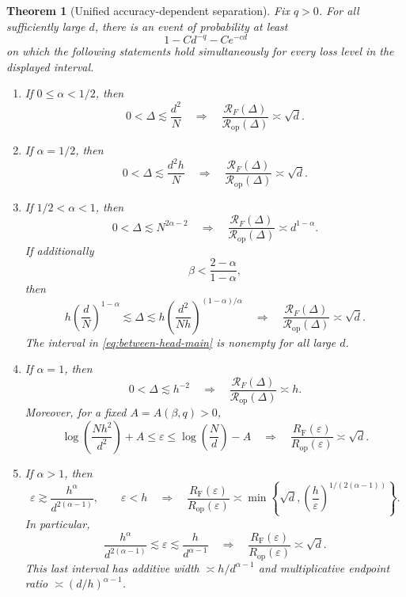 \documentclass[11pt]{article}
\newtheorem{theorem}{Theorem}[section]
\theoremstyle{definition}
\newcommand{\RF}{R_{\mathrm F}}
\newcommand{\Rop}{R_{\mathrm{op}}}
\newcommand{\eps}{\varepsilon}
\begin{document}
\begin{theorem}[Unified accuracy-dependent separation]
\label{thm:main}
Fix $q>0$.  For all sufficiently large $d$, there is an event of
probability at least
\begin{equation}
 1-Cd^{-q}-Ce^{-cd}
 \label{eq:main-prob}
\end{equation}
on which the following statements hold simultaneously for every loss
level in the displayed interval.
\begin{enumerate}[label=\textup{(\roman*)}]
\item If $0\leq\alpha<1/2$, then
\[
 0<\Delta\lesssim \frac{d^2}{N}
 \quad\Longrightarrow\quad
 \frac{\mathcal R_F(\Delta)}{\mathcal R_{\mathrm{op}}(\Delta)}
 \asymp\sqrt d.
\]
\item If $\alpha=1/2$, then
\[
 0<\Delta\lesssim \frac{d^2h}{N}
 \quad\Longrightarrow\quad
 \frac{\mathcal R_F(\Delta)}{\mathcal R_{\mathrm{op}}(\Delta)}
 \asymp\sqrt d.
\]
\item If $1/2<\alpha<1$, then
\[
 0<\Delta\lesssim N^{2\alpha-2}
 \quad\Longrightarrow\quad
 \frac{\mathcal R_F(\Delta)}{\mathcal R_{\mathrm{op}}(\Delta)}
 \asymp d^{1-\alpha}.
\]
If additionally
\begin{equation}
 \beta<\frac{2-\alpha}{1-\alpha},
 \label{eq:between-condition}
\end{equation}
then
\begin{equation}
 h\left(\frac dN\right)^{1-\alpha}
 \lesssim\Delta\lesssim
 h\left(\frac{d^2}{Nh}\right)^{(1-\alpha)/\alpha}
 \quad\Longrightarrow\quad
 \frac{\mathcal R_F(\Delta)}{\mathcal R_{\mathrm{op}}(\Delta)}
 \asymp\sqrt d.
 \label{eq:between-head-main}
\end{equation}
The interval in \eqref{eq:between-head-main} is nonempty for all large
$d$.
\item If $\alpha=1$, then
\[
 0<\Delta\lesssim h^{-2}
 \quad\Longrightarrow\quad
 \frac{\mathcal R_F(\Delta)}{\mathcal R_{\mathrm{op}}(\Delta)}
 \asymp h.
\]
Moreover, for a fixed $A=A(\beta,q)>0$,
\begin{equation}
 \log\!\left(\frac{Nh^2}{d^2}\right)+A
 \leq\eps\leq
 \log\!\left(\frac Nd\right)-A
 \quad\Longrightarrow\quad
 \frac{\RF(\eps)}{\Rop(\eps)}\asymp\sqrt d.
 \label{eq:alpha-one-main}
\end{equation}
\item If $\alpha>1$, then
\begin{equation}
 \eps\gtrsim\frac{h^\alpha}{d^{2(\alpha-1)}},\qquad \eps<h
 \quad\Longrightarrow\quad
 \frac{\RF(\eps)}{\Rop(\eps)}
 \asymp
 \min\left\{\sqrt d,
 \left(\frac h\eps\right)^{1/(2(\alpha-1))}\right\}.
 \label{eq:alpha-greater-main}
\end{equation}
In particular,
\[
 \frac{h^\alpha}{d^{2(\alpha-1)}}\lesssim\eps
 \lesssim\frac h{d^{\alpha-1}}
 \quad\Longrightarrow\quad
 \frac{\RF(\eps)}{\Rop(\eps)}\asymp\sqrt d.
\]
This last interval has additive width $\asymp h/d^{\alpha-1}$ and
multiplicative endpoint ratio $\asymp(d/h)^{\alpha-1}$.
\end{enumerate}


\end{theorem}
\end{document}
